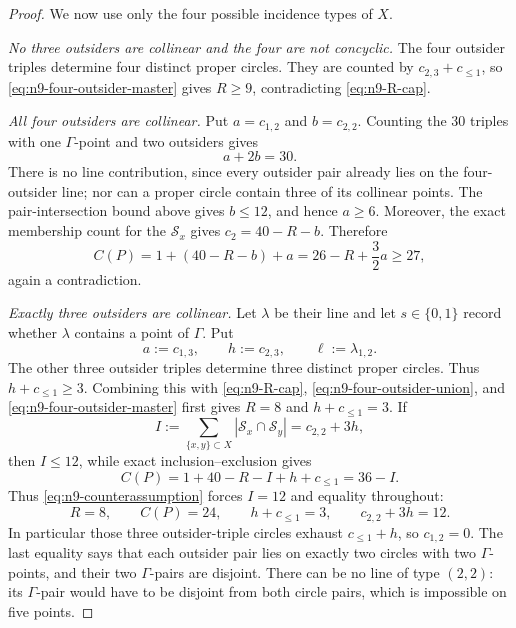 \begin{proof}
We now use only the four possible incidence types of \(X\).

\emph{No three outsiders are collinear and the four are not concyclic.}
The four outsider triples determine four distinct proper circles.  They
are counted by \(c_{2,3}+c_{\leq1}\), so
\eqref{eq:n9-four-outsider-master} gives \(R\geq9\), contradicting
\eqref{eq:n9-R-cap}.

\emph{All four outsiders are collinear.}
Put \(a=c_{1,2}\) and \(b=c_{2,2}\).  Counting the \(30\) triples with one
\(\Gamma\)-point and two outsiders gives
\begin{equation}\label{eq:n9-collinear-four-count}
 a+2b=30.
\end{equation}
There is no line contribution, since every outsider pair already lies on
the four-outsider line; nor can a proper circle contain three of its
collinear points.  The pair-intersection bound above gives \(b\leq12\),
and hence \(a\geq6\).  Moreover, the exact membership count for the
\(\mathcal S_x\) gives \(c_2=40-R-b\).  Therefore
\[
 C(P)=1+(40-R-b)+a
     =26-R+\frac32a\geq27,
\]
again a contradiction.

\emph{Exactly three outsiders are collinear.}
Let \(\lambda\) be their line and let \(s\in\{0,1\}\) record whether
\(\lambda\) contains a point of \(\Gamma\).  Put
\[
 a:=c_{1,3},\qquad h:=c_{2,3},\qquad
 \ell:=\lambda_{1,2}.
\]
The other three outsider triples determine three distinct proper circles.
Thus \(h+c_{\leq1}\geq3\).  Combining this with
\eqref{eq:n9-R-cap}, \eqref{eq:n9-four-outsider-union}, and
\eqref{eq:n9-four-outsider-master} first gives
\(R=8\) and \(h+c_{\leq1}=3\).  If
\[
 I:=\sum_{\{x,y\}\subset X}|\mathcal S_x\cap\mathcal S_y|
   =c_{2,2}+3h,
\]
then \(I\leq12\), while exact inclusion--exclusion gives
\[
 C(P)=1+40-R-I+h+c_{\leq1}=36-I.
\]
Thus \eqref{eq:n9-counterassumption} forces \(I=12\) and equality
throughout:
\begin{equation}\label{eq:n9-three-collinear-equality}
 R=8,\qquad C(P)=24,\qquad
 h+c_{\leq1}=3,\qquad c_{2,2}+3h=12.
\end{equation}
In particular those three outsider-triple circles exhaust
\(c_{\leq1}+h\), so \(c_{1,2}=0\).  The last equality says that each
outsider pair lies on exactly two circles with two \(\Gamma\)-points, and
their two \(\Gamma\)-pairs are disjoint.  There can be no line of type
\((2,2)\): its \(\Gamma\)-pair would have to be disjoint from both circle
pairs, which is impossible on five points.


\end{proof}
